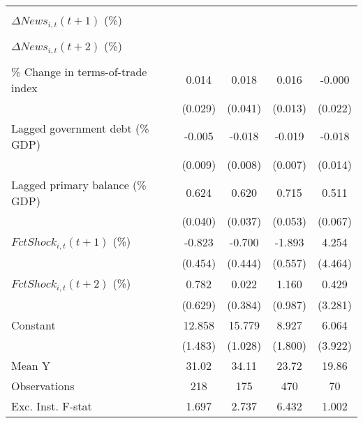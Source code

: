 {\begin{tabular}{l*{4}{c}}
                    &                     &                     &                     &                     \\
\addlinespace
$ \Delta News_{i,t}(t+1)$ (\%)&                     &                     &                     &                     \\
                    &                     &                     &                     &                     \\
\addlinespace
$ \Delta News_{i,t}(t+2)$ (\%)&                     &                     &                     &                     \\
                    &                     &                     &                     &                     \\
\addlinespace
\% Change in terms-of-trade index&       0.014         &       0.018         &       0.016         &      -0.000         \\
                    &     (0.029)         &     (0.041)         &     (0.013)         &     (0.022)         \\
\addlinespace
Lagged government debt (\% GDP)&      -0.005         &      -0.018\sym{*}  &      -0.019\sym{**} &      -0.018         \\
                    &     (0.009)         &     (0.008)         &     (0.007)         &     (0.014)         \\
\addlinespace
Lagged primary balance (\% GDP)&       0.624\sym{***}&       0.620\sym{***}&       0.715\sym{***}&       0.511\sym{***}\\
                    &     (0.040)         &     (0.037)         &     (0.053)         &     (0.067)         \\
\addlinespace
$ FctShock_{i,t}(t+1)$ (\%)&      -0.823\sym{*}  &      -0.700         &      -1.893\sym{***}&       4.254         \\
                    &     (0.454)         &     (0.444)         &     (0.557)         &     (4.464)         \\
\addlinespace
$ FctShock_{i,t}(t+2)$ (\%)&       0.782         &       0.022         &       1.160         &       0.429         \\
                    &     (0.629)         &     (0.384)         &     (0.987)         &     (3.281)         \\
\addlinespace
Constant            &      12.858\sym{***}&      15.779\sym{***}&       8.927\sym{***}&       6.064         \\
                    &     (1.483)         &     (1.028)         &     (1.800)         &     (3.922)         \\
\midrule
Mean Y              &       31.02         &       34.11         &       23.72         &       19.86         \\
Observations        &         218         &         175         &         470         &          70         \\
Exc. Inst. F-stat   &       1.697         &       2.737         &       6.432         &       1.002         \\
\bottomrule
\end{tabular}
}
